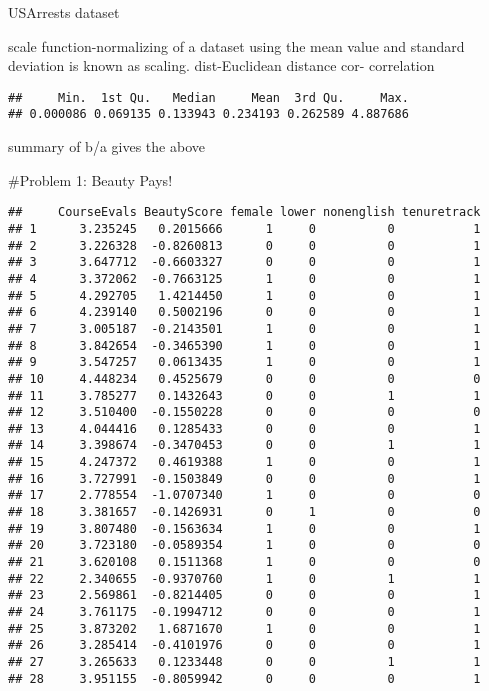 \documentclass[
]{article}
\begin{document}
USArrests dataset

scale function-normalizing of a dataset using the mean value and
standard deviation is known as scaling. dist-Euclidean distance cor-
correlation

\begin{verbatim}
##     Min.  1st Qu.   Median     Mean  3rd Qu.     Max. 
## 0.000086 0.069135 0.133943 0.234193 0.262589 4.887686
\end{verbatim}

summary of b/a gives the above

\#Problem 1: Beauty Pays!

\begin{verbatim}
##     CourseEvals BeautyScore female lower nonenglish tenuretrack
## 1      3.235245   0.2015666      1     0          0           1
## 2      3.226328  -0.8260813      0     0          0           1
## 3      3.647712  -0.6603327      0     0          0           1
## 4      3.372062  -0.7663125      1     0          0           1
## 5      4.292705   1.4214450      1     0          0           1
## 6      4.239140   0.5002196      0     0          0           1
## 7      3.005187  -0.2143501      1     0          0           1
## 8      3.842654  -0.3465390      1     0          0           1
## 9      3.547257   0.0613435      1     0          0           1
## 10     4.448234   0.4525679      0     0          0           0
## 11     3.785277   0.1432643      0     0          1           1
## 12     3.510400  -0.1550228      0     0          0           0
## 13     4.044416   0.1285433      0     0          0           1
## 14     3.398674  -0.3470453      0     0          1           1
## 15     4.247372   0.4619388      1     0          0           1
## 16     3.727991  -0.1503849      0     0          0           1
## 17     2.778554  -1.0707340      1     0          0           0
## 18     3.381657  -0.1426931      0     1          0           0
## 19     3.807480  -0.1563634      1     0          0           1
## 20     3.723180  -0.0589354      1     0          0           0
## 21     3.620108   0.1511368      1     0          0           0
## 22     2.340655  -0.9370760      1     0          1           1
## 23     2.569861  -0.8214405      0     0          0           1
## 24     3.761175  -0.1994712      0     0          0           1
## 25     3.873202   1.6871670      1     0          0           1
## 26     3.285414  -0.4101976      0     0          0           1
## 27     3.265633   0.1233448      0     0          1           1
## 28     3.951155  -0.8059942      0     0          0           1

\end{verbatim}
\end{document}
